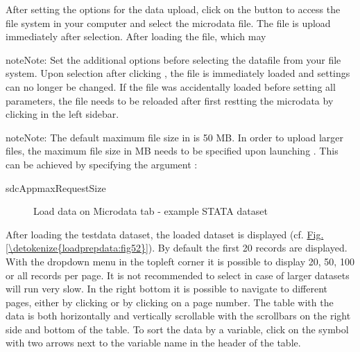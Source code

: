\documentclass[letterpaper,10pt,english]{sphinxmanual}
\begin{document}
After setting the options for the data upload, click on the button  to access
the file system in your computer and select the microdata file. The file is upload
immediately after selection. After loading the file, which may

\begin{sphinxadmonition}{note}{Note:}
Set the additional options before selecting the datafile from your file system.
Upon selection after clicking , the file is immediately loaded and settings
can no longer be changed. If the file was accidentally loaded before setting all
parameters, the file needs to be reloaded after first restting the microdata by
clicking  in the left sidebar.
\end{sphinxadmonition}

\begin{sphinxadmonition}{note}{Note:}
The default maximum file size in  is 50 MB. In order to upload larger files,
the maximum file size in MB needs to be specified upon launching . This can
be achieved by specifying the argument :

\def\sphinxLiteralBlockLabel{\label{\detokenize{loadprepdata:id4}}}
%
\begin{sphinxVerbatim}[commandchars=\\\{\},numbers=left,firstnumber=1,stepnumber=1]
sdcAppmaxRequestSize  
\end{sphinxVerbatim}
\end{sphinxadmonition}

\begin{figure}[htbp]
\centering
\capstart

\noindent{}
\caption{Load data on Microdata tab - example STATA dataset}\label{\detokenize{loadprepdata:fig53}}\label{\detokenize{loadprepdata:id5}}\end{figure}

After loading the testdata dataset, the loaded
dataset is displayed (cf. \hyperref[\detokenize{loadprepdata:fig52}]{Fig.\@ \ref{\detokenize{loadprepdata:fig52}}}). By default the first 20 records are displayed.
With the dropdown menu in the topleft corner it is possible to display 20, 50, 100 or all
records per page. It is not recommended to select  in case of larger datasets
 will run very slow. In the right bottom it is possible to navigate to different pages,
either by clicking  or by clicking on a page number. The table
with the data is both horizontally and vertically scrollable with the scrollbars on the
right side and bottom of the table. To sort the data by a variable, click on the symbol
with two arrows next to the variable name in the header of the table.
\end{document}
